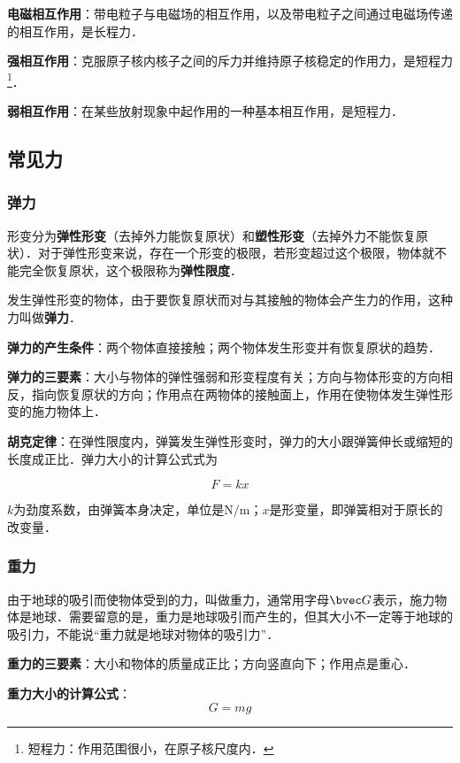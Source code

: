 \textbf{电磁相互作用}：带电粒子与电磁场的相互作用，以及带电粒子之间通过电磁场传递的相互作用，是长程力．

\textbf{强相互作用}：克服原子核内核子之间的斥力并维持原子核稳定的作用力，是短程力\footnote{短程力：作用范围很小，在原子核尺度内．}．

\textbf{弱相互作用}：在某些放射现象中起作用的一种基本相互作用，是短程力．

\subsection{常见力}

\subsubsection{弹力}
形变分为\textbf{弹性形变}（去掉外力能恢复原状）和\textbf{塑性形变}（去掉外力不能恢复原状）．对于弹性形变来说，存在一个形变的极限，若形变超过这个极限，物体就不能完全恢复原状，这个极限称为\textbf{弹性限度}．

发生弹性形变的物体，由于要恢复原状而对与其接触的物体会产生力的作用，这种力叫做\textbf{弹力}．

\textbf{弹力的产生条件}：两个物体直接接触；两个物体发生形变并有恢复原状的趋势．

\textbf{弹力的三要素}：大小与物体的弹性强弱和形变程度有关；方向与物体形变的方向相反，指向恢复原状的方向；作用点在两物体的接触面上，作用在使物体发生弹性形变的施力物体上．

\textbf{胡克定律}：在弹性限度内，弹簧发生弹性形变时，弹力的大小跟弹簧伸长或缩短的长度成正比．弹力大小的计算公式式为

\begin{equation}
F=kx
\end{equation}

$k$为劲度系数，由弹簧本身决定，单位是$\mathrm{N/m}$；$x$是形变量，即弹簧相对于原长的改变量．

\subsubsection{重力}
由于地球的吸引而使物体受到的力，叫做重力，通常用字母$\bvec G$表示，施力物体是地球．需要留意的是，重力是地球吸引而产生的，但其大小不一定等于地球的吸引力，不能说“重力就是地球对物体的吸引力”．

\textbf{重力的三要素}：大小和物体的质量成正比；方向竖直向下；作用点是重心．

\textbf{重力大小的计算公式}：
\begin{equation}
G=mg
\end{equation}

